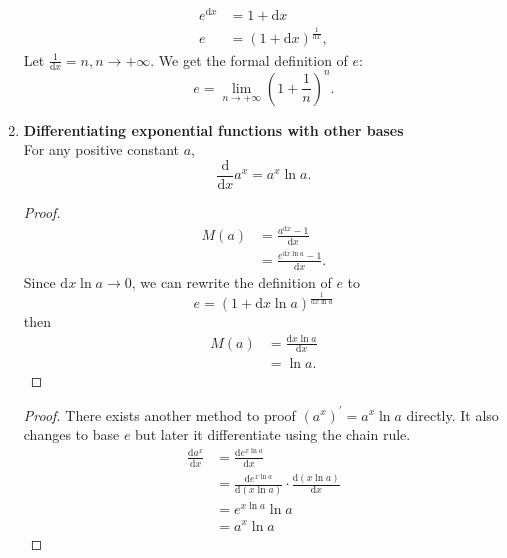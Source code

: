 \begin{enumerate}
\begin{align*}
            e^{\mathrm{d}x} & =1+\mathrm{d}x\\
            e & =(1+\mathrm{d}x)^{\frac{1}{\mathrm{d}x}},
        \end{align*}
        Let \(\frac{1}{\mathrm{d}x}=n, n\to +\infty\). We get the formal definition of \(e\):
        \[
            e=\lim_{n\to+\infty}(1+\frac{1}{n})^n.
        \]
    \item \textbf{Differentiating exponential functions with other bases}\\
        \indent For any positive constant \(a\),
        \[
            \frac{\mathrm{d}}{\mathrm{d}x}a^x=a^x\ln a.
        \]
        \begin{proof}
            \begin{align*}
                M(a) & =\frac{a^{\mathrm{d}x}-1}{\mathrm{d}x}\\
                     & =\frac{e^{\mathrm{d}x\ln a}-1}{\mathrm{d}x}.
            \end{align*}
            Since \(\mathrm{d}x\ln a\to0\), we can rewrite the definition of \(e\) to
            \[
                e=(1+\mathrm{d}x\ln a)^\frac{1}{\mathrm{d}x\ln a}
            \]
            then
            \begin{align*}
                M(a) & =\frac{\mathrm{d}x\ln a}{\mathrm{d}x}\\
                     & =\ln a.
            \end{align*}
        \end{proof}
        \begin{proof}
            There exists another method to proof \((a^x)^\prime=a^x\ln a\) directly. It also changes to base \(e\) but later it differentiate using the chain rule.
            \begin{align*}
                \frac{\mathrm{d}a^x}{\mathrm{d}x} & =\frac{\mathrm{d}e^{x\ln a}}{\mathrm{d}x}\\
                                                 & =\frac{\mathrm{d}e^{x\ln a}}{\mathrm{d}(x\ln a)}\cdot\frac{\mathrm{d}(x\ln a)}{\mathrm{d}x}\\
                                                 & =e^{x\ln a}\ln a\\
                                                 & =a^x\ln a
            \end{align*}
        \end{proof}
\end{enumerate}

